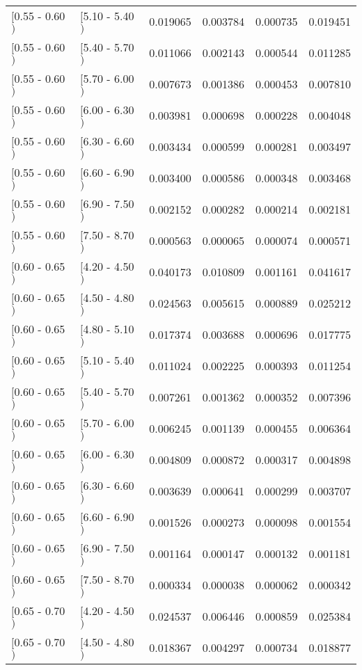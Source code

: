 \begin{longtable}{| l | l | r | r | r | r |}
$[$0.55 - 0.60$)$ & $[$5.10 - 5.40$)$ & 0.019065 & 0.003784 & 0.000735 & 0.019451 \\
$[$0.55 - 0.60$)$ & $[$5.40 - 5.70$)$ & 0.011066 & 0.002143 & 0.000544 & 0.011285 \\
$[$0.55 - 0.60$)$ & $[$5.70 - 6.00$)$ & 0.007673 & 0.001386 & 0.000453 & 0.007810 \\
$[$0.55 - 0.60$)$ & $[$6.00 - 6.30$)$ & 0.003981 & 0.000698 & 0.000228 & 0.004048 \\
$[$0.55 - 0.60$)$ & $[$6.30 - 6.60$)$ & 0.003434 & 0.000599 & 0.000281 & 0.003497 \\
$[$0.55 - 0.60$)$ & $[$6.60 - 6.90$)$ & 0.003400 & 0.000586 & 0.000348 & 0.003468 \\
$[$0.55 - 0.60$)$ & $[$6.90 - 7.50$)$ & 0.002152 & 0.000282 & 0.000214 & 0.002181 \\
$[$0.55 - 0.60$)$ & $[$7.50 - 8.70$)$ & 0.000563 & 0.000065 & 0.000074 & 0.000571 \\
$[$0.60 - 0.65$)$ & $[$4.20 - 4.50$)$ & 0.040173 & 0.010809 & 0.001161 & 0.041617 \\
$[$0.60 - 0.65$)$ & $[$4.50 - 4.80$)$ & 0.024563 & 0.005615 & 0.000889 & 0.025212 \\
$[$0.60 - 0.65$)$ & $[$4.80 - 5.10$)$ & 0.017374 & 0.003688 & 0.000696 & 0.017775 \\
$[$0.60 - 0.65$)$ & $[$5.10 - 5.40$)$ & 0.011024 & 0.002225 & 0.000393 & 0.011254 \\
$[$0.60 - 0.65$)$ & $[$5.40 - 5.70$)$ & 0.007261 & 0.001362 & 0.000352 & 0.007396 \\
$[$0.60 - 0.65$)$ & $[$5.70 - 6.00$)$ & 0.006245 & 0.001139 & 0.000455 & 0.006364 \\
$[$0.60 - 0.65$)$ & $[$6.00 - 6.30$)$ & 0.004809 & 0.000872 & 0.000317 & 0.004898 \\
$[$0.60 - 0.65$)$ & $[$6.30 - 6.60$)$ & 0.003639 & 0.000641 & 0.000299 & 0.003707 \\
$[$0.60 - 0.65$)$ & $[$6.60 - 6.90$)$ & 0.001526 & 0.000273 & 0.000098 & 0.001554 \\
$[$0.60 - 0.65$)$ & $[$6.90 - 7.50$)$ & 0.001164 & 0.000147 & 0.000132 & 0.001181 \\
$[$0.60 - 0.65$)$ & $[$7.50 - 8.70$)$ & 0.000334 & 0.000038 & 0.000062 & 0.000342 \\
$[$0.65 - 0.70$)$ & $[$4.20 - 4.50$)$ & 0.024537 & 0.006446 & 0.000859 & 0.025384 \\
$[$0.65 - 0.70$)$ & $[$4.50 - 4.80$)$ & 0.018367 & 0.004297 & 0.000734 & 0.018877 \\

\end{longtable}
